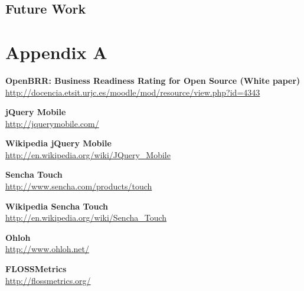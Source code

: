 \documentclass[a4paper,12pt]{book}
\begin{document}
\section{Future Work}
\label{sec:future}


\appendix
\chapter{Appendix A}
\label{app:appenda}

\begin{thebibliography}{25}
 

\textbf{OpenBRR: Business Readiness Rating for
Open Source (White paper)}\\
{\footnotesize\url{
http://docencia.etsit.urjc.es/moodle/mod/resource/view.php?id=4343}}

\textbf{jQuery Mobile}\\
{\footnotesize\url{http://jquerymobile.com/}}

\textbf{Wikipedia jQuery Mobile}\\
{\footnotesize\url{http://en.wikipedia.org/wiki/JQuery_Mobile}}

\textbf{Sencha Touch}\\
{\footnotesize\url{http://www.sencha.com/products/touch}}

\textbf{Wikipedia Sencha Touch}\\
{\footnotesize\url{http://en.wikipedia.org/wiki/Sencha_Touch}}

\textbf{Ohloh}\\
{\footnotesize\url{http://www.ohloh.net/}}

\textbf{FLOSSMetrics}\\
{\footnotesize\url{http://flossmetrics.org/}}

%

\end{thebibliography}
\end{document}
